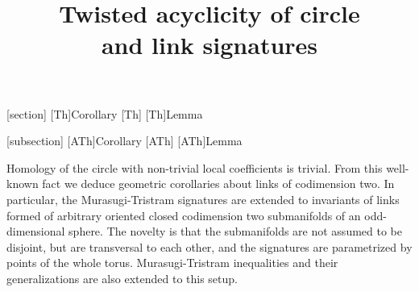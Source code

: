 \documentclass{article}
\numberwithin{equation}{section}
\begin{document}

[section]{\bf}{\it}
\renewcommand{\theTh}{\thesection.\Alph{Th}}
[Th]{Corollary}{\bf}{\it}
[Th]{}{\bf}{\it}
[Th]{Lemma}{\bf}{\it}

[subsection]{\bf}{\it}
\renewcommand{\theATh}{\Alph{subsection}.\Alph{ATh}}
[ATh]{Corollary}{\bf}{\it}
[ATh]{}{\bf}{\it}
[ATh]{Lemma}{\bf}{\it}
                                               

\title{Twisted acyclicity of circle\\
and  link signatures}
\author{}
\date{}
                                
\maketitle

\abstract
{Homology of the circle with non-trivial local coefficients 
is trivial. From this well-known fact we deduce geometric 
corollaries about links of codimension two. In particular,
the Murasugi-Tristram signatures are extended to invariants of
links formed of arbitrary oriented closed codimension two 
submanifolds of an odd-dimensional sphere. The novelty is 
that the submanifolds are not assumed to be disjoint, but
are transversal to each other, and the signatures are parametrized
by points of the whole torus. Murasugi-Tristram inequalities 
and their generalizations are also extended to this setup.}
\end{document}
